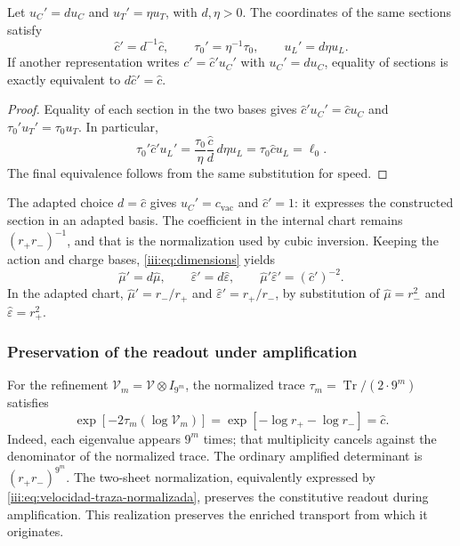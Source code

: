 \begin{proposition}
Let $u_C'=d u_C$ and $u_T'=\eta u_T$, with $d,\eta>0$.
The coordinates of the same sections satisfy
\begin{equation}
 \widehat c'=d^{-1}\widehat c,
 \qquad \tau_0'=\eta^{-1}\tau_0,
 \qquad u_L'=d\eta u_L.
 \label{iii:eq:velocidad-cambio-carta}
\end{equation}
If another representation writes $c'=\widehat c' u_C'$ with $u_C'=d u_C$,
equality of sections is exactly equivalent to $d\widehat c'=\widehat c$.
\end{proposition}
\begin{proof}
Equality of each section in the two bases gives
$\widehat c'u_C'=\widehat c u_C$ and $\tau_0'u_T'=\tau_0u_T$.
In particular,
\[
 \tau_0'\widehat c'u_L'
 =\frac{\tau_0}{\eta}\frac{\widehat c}{d}\,d\eta u_L
 =\tau_0\widehat c u_L=\ell_0.
\]
The final equivalence follows from the same substitution for speed.
\end{proof}

The adapted choice $d=\widehat c$ gives $u_C'=c_{\mathrm{vac}}$ and
$\widehat c'=1$: it expresses the constructed section in an adapted basis.
The coefficient in the internal chart remains $(r_+r_-)^{-1}$, and that
is the normalization used by cubic inversion. Keeping the
action and charge bases, \eqref{iii:eq:dimensions} yields
\[
 \widehat\mu'=d\widehat\mu,\qquad
 \widehat\varepsilon'=d\widehat\varepsilon,\qquad
 \widehat\mu'\widehat\varepsilon'=(\widehat c')^{-2}.
\]
In the adapted chart, $\widehat\mu'=r_-/r_+$ and
$\widehat\varepsilon'=r_+/r_-$, by substitution of
$\widehat\mu=r_-^2$ and $\widehat\varepsilon=r_+^2$.

\subsubsection{Preservation of the readout under amplification}

For the refinement $\mathcal V_m=\mathcal V\otimes I_{9^m}$, the
normalized trace $\tau_m=\operatorname{Tr}/(2\cdot9^m)$ satisfies
\begin{equation}
 \exp[-2\tau_m(\log\mathcal V_m)]
 =\exp[-\log r_+-\log r_-]=\widehat c.
 \label{iii:eq:velocidad-traza-normalizada}
\end{equation}
Indeed, each eigenvalue appears $9^m$ times; that multiplicity
cancels against the denominator of the normalized trace. The ordinary
amplified determinant is $(r_+r_-)^{9^m}$. The two-sheet normalization,
equivalently expressed by \eqref{iii:eq:velocidad-traza-normalizada},
preserves the constitutive readout during amplification. This
realization preserves the enriched transport from which it originates.
